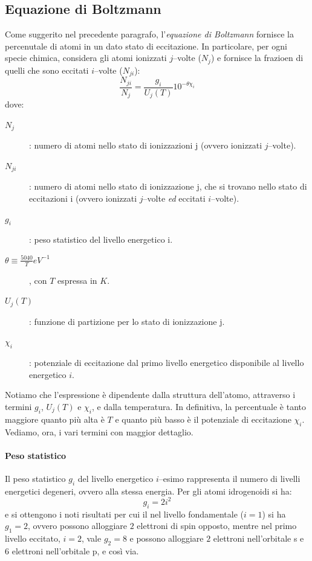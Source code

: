 \subsection{Equazione di Boltzmann}\label{sec:equazione-boltzmann}
Come suggerito nel precedente paragrafo, l'\emph{equazione di Boltzmann} fornisce la percenutale di atomi in un dato stato di eccitazione. In particolare, per ogni specie chimica, considera gli atomi ionizzati $j$--volte ($N_j$) e fornisce la frazioen di quelli che sono eccitati $i$--volte ($N_{ji}$):
\begin{equation}\label{eq:equazione-boltzmann}
    \dfrac{N_{ji}}{N_j} = \dfrac{g_i}{{U_j}(T)} 10^{-\theta \chi_i} 
\end{equation}
dove:
\begin{description}
    \item[$N_j$]: numero di atomi nello stato di ionizzazioni j (ovvero ionizzati $j$--volte).
    \item[$N_{ji}$]: numero di atomi nello stato di ionizzazione j, che si trovano nello stato di eccitazioni i (ovvero ionizzati $j$--volte \emph{ed} eccitati $i$--volte).
    \item[$g_i$]: peso statistico del livello energetico i.
    \item[$\theta \equiv \frac{5040}{T} \si{eV^{-1}}$], con $T$ espressa in $\si{K}$.
    \item[${U_j}(T)$]: funzione di partizione per lo stato di ionizzazione j.
    \item[$\chi_i$]: potenziale di eccitazione dal primo livello energetico disponibile al livello energetico $i$.      
\end{description}
Notiamo che l'espressione è dipendente dalla struttura dell'atomo, attraverso i termini $g_i$, ${U_j}(T)$ e $\chi_i$, e dalla temperatura. In definitiva, la percentuale è tanto maggiore quanto più alta è $T$ e quanto più basso è il potenziale di eccitazione $\chi_i$. Vediamo, ora, i vari termini con maggior dettaglio.

\paragraph{Peso statistico}
Il peso statistico $g_i$ del livello energetico $i$--esimo rappresenta il numero di livelli energetici degeneri, ovvero alla stessa energia. Per gli atomi idrogenoidi si ha:
\begin{equation*}
g_i = 2 i^2
\end{equation*}
e si ottengono i noti risultati per cui il nel livello fondamentale ($i=1$) si ha $g_1 = 2$, ovvero possono alloggiare $2$ elettroni di spin opposto, mentre nel primo livello eccitato, $i=2$, vale $g_2=8$ e possono alloggiare $2$ elettroni nell'orbitale s e $6$ elettroni nell'orbitale p, e così via.

